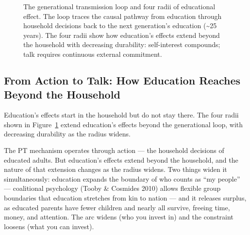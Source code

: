 \documentclass[12pt,letterpaper]{article}
\begin{document}
\begin{figure}[htbp]
{%
}
\caption{The generational transmission loop and four radii of educational effect. The loop traces the causal pathway from education through household decisions back to the next generation's education (\textasciitilde{}25 years). The four radii show how education's effects extend beyond the household with decreasing durability: self-interest compounds; talk requires continuous external commitment.}
\label{fig:mechanism}
\end{figure}

\subsection{From Action to Talk: How Education Reaches Beyond the Household}\label{from-action-to-talk-how-education-reaches-beyond-the-household}

Education's effects start in the household but do not stay there. The
four radii shown in Figure~\ref{fig:mechanism} extend education's
effects beyond the generational loop, with decreasing durability as the
radius widens.

The PT mechanism operates through action --- the household decisions of
educated adults. But education's effects extend beyond the household,
and the nature of that extension changes as the radius widens. Two
things widen it simultaneously: education expands the boundary of who
counts as ``my people'' --- coalitional psychology (Tooby \& Cosmides
2010) allows flexible group boundaries that education stretches from kin
to nation --- and it releases surplus, as educated parents have fewer
children and nearly all survive, freeing time, money, and attention.
The arc widens (who you invest in) and the constraint loosens (what you
can invest).
\end{document}
